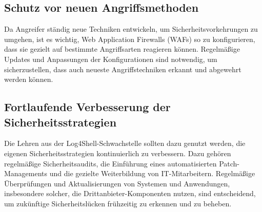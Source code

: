 \subsection{Schutz vor neuen Angriffsmethoden}

Da Angreifer ständig neue Techniken entwickeln, um Sicherheitsvorkehrungen zu umgehen, ist es wichtig, Web Application Firewalls (WAFs) so zu konfigurieren, dass sie gezielt auf bestimmte Angriffsarten reagieren können. Regelmäßige Updates und Anpassungen der Konfigurationen sind notwendig, um sicherzustellen, dass auch neueste Angriffstechniken erkannt und abgewehrt werden können.

\subsection{Fortlaufende Verbesserung der Sicherheitsstrategien}

Die Lehren aus der Log4Shell-Schwachstelle sollten dazu genutzt werden, die eigenen Sicherheitsstrategien kontinuierlich zu verbessern. Dazu gehören regelmäßige Sicherheitsaudits, die Einführung eines automatisierten Patch-Managements und die gezielte Weiterbildung von IT-Mitarbeitern. Regelmäßige Überprüfungen und Aktualisierungen von Systemen und Anwendungen, insbesondere solcher, die Drittanbieter-Komponenten nutzen, sind entscheidend, um zukünftige Sicherheitslücken frühzeitig zu erkennen und zu beheben.